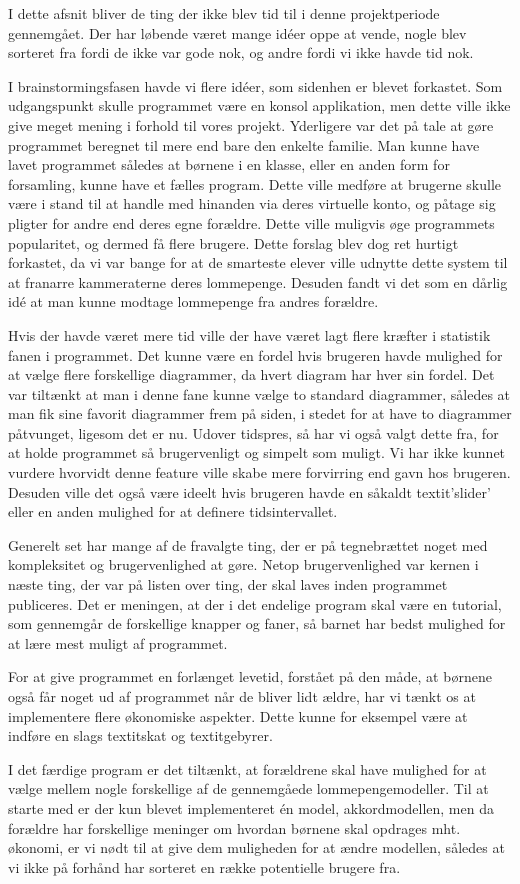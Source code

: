 I dette afsnit bliver de ting der ikke blev tid til i denne projektperiode gennemgået. Der har løbende været mange idéer oppe at vende, nogle blev sorteret fra fordi de ikke var gode nok, og andre fordi vi ikke havde tid nok. 

I brainstormingsfasen havde vi flere idéer, som sidenhen er blevet forkastet. Som udgangspunkt skulle programmet være en konsol applikation, men dette ville ikke give meget mening i forhold til vores projekt. Yderligere var det på tale at gøre programmet beregnet til mere end bare den enkelte familie. Man kunne have lavet programmet således at børnene i en klasse, eller en anden form for forsamling, kunne have et fælles program. Dette ville medføre at brugerne skulle være i stand til at handle med hinanden via deres virtuelle konto, og påtage sig pligter for andre end deres egne forældre. Dette ville muligvis øge programmets popularitet, og dermed få flere brugere. Dette forslag blev dog ret hurtigt forkastet, da vi var bange for at de smarteste elever ville udnytte dette system til at franarre kammeraterne deres lommepenge. Desuden fandt vi det som en dårlig idé at man kunne modtage lommepenge fra andres forældre.

Hvis der havde været mere tid ville der have været lagt flere kræfter i statistik fanen i programmet. Det kunne være en fordel hvis brugeren havde mulighed for at vælge flere forskellige diagrammer, da hvert diagram har hver sin fordel. Det var tiltænkt at man i denne fane kunne vælge to standard diagrammer, således at man fik sine favorit diagrammer frem på siden, i stedet for at have to diagrammer påtvunget, ligesom det er nu. Udover tidspres, så har vi også valgt dette fra, for at holde programmet så brugervenligt og simpelt som muligt. Vi har ikke kunnet vurdere hvorvidt denne feature ville skabe mere forvirring end gavn hos brugeren. Desuden ville det også være ideelt hvis brugeren havde en såkaldt textit{'slider'} eller en anden mulighed for at definere tidsintervallet.

Generelt set har mange af de fravalgte ting, der er på tegnebrættet noget med kompleksitet og brugervenlighed at gøre. Netop brugervenlighed var kernen i næste ting, der var på listen over ting, der skal laves inden programmet publiceres. Det er meningen, at der i det endelige program skal være en tutorial, som gennemgår de forskellige knapper og faner, så barnet har bedst mulighed for at lære mest muligt af programmet.

For at give programmet en forlænget levetid, forstået på den måde, at børnene også får noget ud af programmet når de bliver lidt ældre, har vi tænkt os at implementere flere økonomiske aspekter. Dette kunne for eksempel være at indføre en slags textit{skat} og textit{gebyrer}.

I det færdige program er det tiltænkt, at forældrene skal have mulighed for at vælge mellem nogle forskellige af de gennemgåede lommepengemodeller. Til at starte med er der kun blevet implementeret én model, akkordmodellen, men da forældre har forskellige meninger om hvordan børnene skal opdrages mht. økonomi, er vi nødt til at give dem muligheden for at ændre modellen, således at vi ikke på forhånd har sorteret en række potentielle brugere fra.

